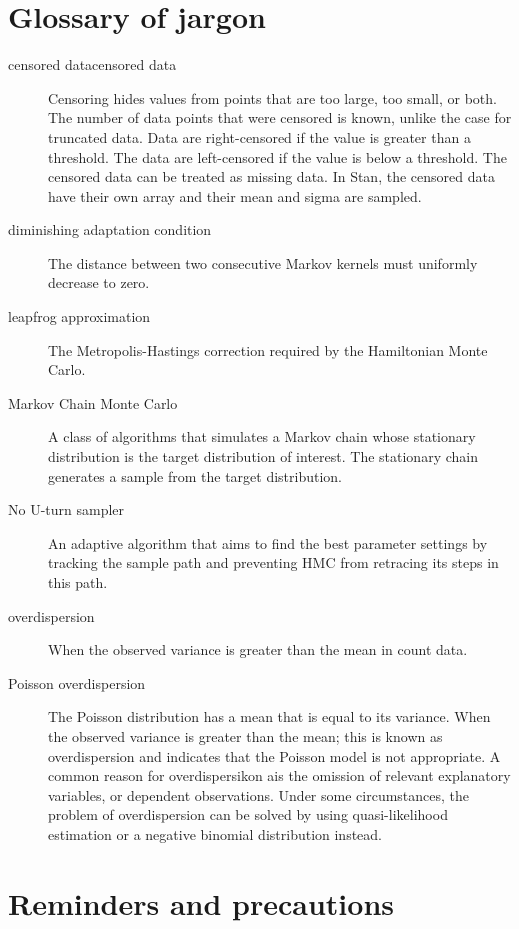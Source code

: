 \documentclass[10pt,letterpaper]{article}
\begin{document}
\section{Glossary of jargon}

\begin{description}
  \item [censored datacensored data] Censoring hides values from points that are too large, too small, or both. The number of data points that were censored is known, unlike the case for truncated data. Data are right-censored if the value is greater than a threshold. The data are left-censored if the value is below a threshold. The censored data can be treated as missing data. In Stan, the censored data have their own array and their mean and sigma are sampled.
  \item [diminishing adaptation condition] The distance between two consecutive Markov kernels must uniformly decrease to zero.
  \item [leapfrog approximation] The Metropolis-Hastings correction required by the Hamiltonian Monte Carlo.
  \item [Markov Chain Monte Carlo] A class of algorithms that simulates a Markov chain whose stationary distribution is the target distribution of interest. The stationary chain generates a sample from the target distribution.
  \item [No U-turn sampler] An adaptive algorithm that aims to find the best parameter settings by tracking the sample path and preventing HMC from retracing its steps in this path.
  \item [overdispersion] When the observed variance is greater than the mean in count data.
  \item [Poisson overdispersion] The Poisson distribution has a mean that is equal to its variance. When the observed variance is greater than the mean; this is known as overdispersion and indicates that the Poisson model is not appropriate. A common reason for overdispersikon ais the omission of relevant explanatory variables, or dependent observations. Under some circumstances, the problem of overdispersion can be solved by using quasi-likelihood estimation or a negative binomial distribution instead.
\end{description}



\section{Reminders and precautions}




\printindex
\end{document}
